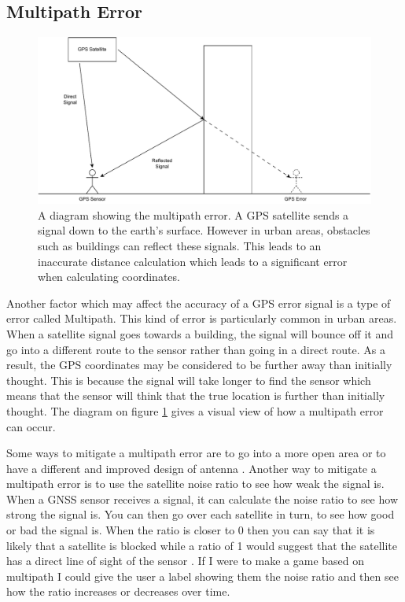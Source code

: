 \documentclass{l4proj}
\begin{document}
\subsection{Multipath Error}
\begin{figure}
    \centering
    \includegraphics[width=1.00\linewidth]{images/multipath.pdf}
    \caption{A diagram showing the multipath error. A GPS satellite sends a signal down to the earth's surface. However in urban areas, obstacles such as buildings
    can reflect these signals. This leads to an inaccurate distance calculation which leads to a significant error when calculating coordinates.}
    \label{fig:multipath}
\end{figure}
Another factor which may affect the accuracy of a GPS error signal is a type of error called Multipath. This kind of error is particularly
common in urban areas. When a satellite signal goes towards a building, the signal will bounce off it and go into a different route to the
sensor rather than going in a direct route. As a result, the GPS coordinates may be considered to be further away than initially thought.
This is because the signal will take longer to find the sensor which means that the sensor will think that the true location is further than
initially thought. The diagram on figure \ref{fig:multipath} gives a visual view of how a multipath error can occur.

Some ways to mitigate a multipath error are to go into a more open area or to have a different and improved design
of antenna \citep{Kos2010}. Another way to mitigate a multipath error is to use the 
satellite noise ratio to see how weak the signal is. When a GNSS sensor receives a signal, it can calculate 
the noise ratio to see how strong the signal is. You can then go over each satellite in turn, to see how
good or bad the signal is. When the ratio is closer to 0 then you can say that it is likely that a satellite is blocked
while a ratio of 1 would suggest that the satellite has a direct line of sight of the sensor \citep{uberGPS}. If I were
to make a game based on multipath I could give the user a label showing them the noise ratio and then see how the ratio
increases or decreases over time.
\end{document}
